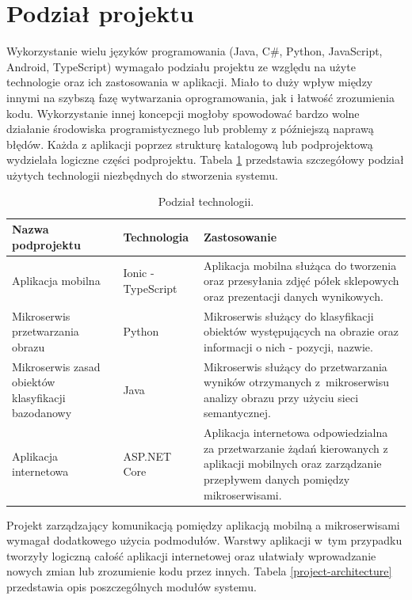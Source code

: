 \section{Podział projektu}
{Wykorzystanie wielu języków programowania (Java, C\#, Python, JavaScript, Android, TypeScript) wymagało podziału projektu ze względu na użyte technologie oraz ich zastosowania w aplikacji. Miało to duży wpływ między innymi na szybszą fazę wytwarzania oprogramowania, jak i łatwość zrozumienia kodu. Wykorzystanie innej koncepcji mogłoby spowodować bardzo wolne działanie środowiska programistycznego lub problemy z późniejszą naprawą błędów. Każda z aplikacji poprzez strukturę katalogową lub podprojektową wydzielała logiczne części podprojektu. Tabela \ref{architecture} przedstawia szczegółowy podział użytych technologii niezbędnych do stworzenia systemu.
	
	\begin{table}[!htb]
		\caption{Podział technologii.}
		\label{architecture}
		\begin{center}
			\begin{tabular}{ | p{4cm}| p{3cm} | p{6cm} |}
				\hline Nazwa podprojektu & Technologia &  Zastosowanie \\ \hline   
				\hline  Aplikacja mobilna &  Ionic - TypeScript & Aplikacja mobilna służąca do tworzenia oraz przesyłania zdjęć półek sklepowych oraz prezentacji danych wynikowych.\\ \hline
				
				\hline  Mikroserwis przetwarzania obrazu & Python & Mikroserwis służący do klasyfikacji obiektów występujących na obrazie oraz informacji o nich - pozycji, nazwie.\\ \hline
				
				\hline Mikroserwis zasad obiektów klasyfikacji \mbox{bazodanowy} & Java & Mikroserwis służący do przetwarzania wyników otrzymanych z~mikroserwisu analizy obrazu przy użyciu sieci semantycznej.\\ \hline
				
				\hline Aplikacja internetowa & ASP.NET Core & Aplikacja internetowa odpowiedzialna za przetwarzanie żądań kierowanych z aplikacji mobilnych oraz zarządzanie przepływem danych pomiędzy mikroserwisami.\\ \hline
			\end{tabular}
		\end{center}
	\end{table}	

Projekt zarządzający komunikacją pomiędzy aplikacją mobilną a mikroserwisami wymagał dodatkowego użycia podmodułów. Warstwy aplikacji w~tym przypadku tworzyły logiczną całość aplikacji internetowej oraz ułatwiały wprowadzanie nowych zmian lub zrozumienie kodu przez innych. Tabela \ref{project-architecture} przedstawia opis poszczególnych modułów systemu.


}
